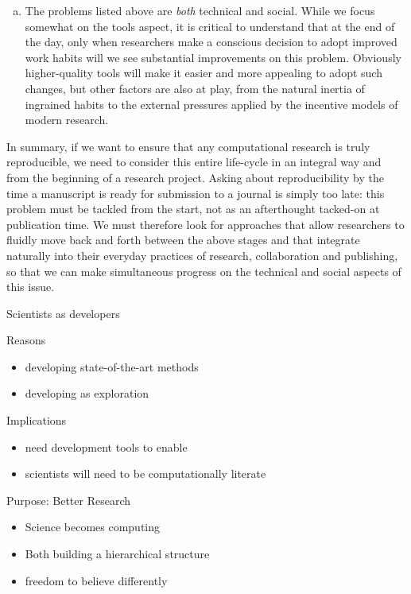 \documentclass[ChapterTOCs,krantz2]{krantz} %
\theoremstyle{definition}
\begin{document}
\begin{enumerate}[(a)]
\item The problems listed above are \emph{both} technical and social.  While we
  focus somewhat on the tools aspect, it is critical to understand that at the
  end of the day, only when researchers make a conscious decision to adopt
  improved work habits will we see substantial improvements on this problem.
  Obviously higher-quality tools will make it easier and more appealing to
  adopt such changes, but other factors are also at play, from the natural
  inertia of ingrained habits to the external pressures applied by the
  incentive models of modern research.
\end{enumerate}

In summary, if we want to ensure that any computational research is truly
reproducible, we need to consider this entire life-cycle in an integral way and
from the beginning of a research project.  Asking about reproducibility by the
time a manuscript is ready for submission to a journal is simply too late: this
problem must be tackled from the start, not as an afterthought tacked-on at
publication time.  We must therefore look for approaches that allow researchers
to fluidly move back and forth between the above stages and that integrate
naturally into their everyday practices of research, collaboration and
publishing, so that we can make simultaneous progress on the technical and
social aspects of this issue.


Scientists as developers

Reasons

\begin{itemize}
\item  developing state-of-the-art methods
\item developing as exploration
\end{itemize}

Implications

\begin{itemize}
\item need development tools to enable
\item scientists will need to be computationally literate
\end{itemize}

Purpose:  Better Research

\begin{itemize}
\item Science becomes computing
\item Both building a hierarchical structure
\item freedom to believe differently
\end{itemize}
\end{document}
